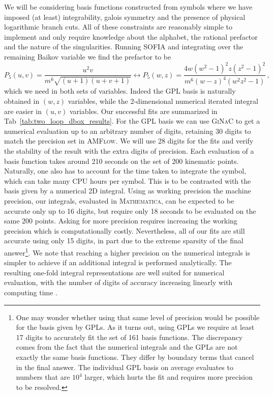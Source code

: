 \documentclass[a4paper,11pt]{article}
\begin{document}
We will be considering basis functions constructed from symbols where we have imposed (at least) integrability, galois symmetry and the presence of physical logarithmic branch cuts. All of these constraints are reasonably simple to implement and only require knowledge about the alphabet, the rational prefactor and the nature of the singularities. Running \textsc{SOFIA} and integrating over the remaining Baikov variable we find the prefactor to be 
\begin{equation}
    P_5(u,v)= \frac{u^2 v}{m^6 \sqrt{(u+1) (u+v+1)}} \leftrightarrow P_5(w,z)= \frac{4 w \left(w^2-1\right)^2 z \left(z^2-1\right)^2}{m^6 (w-z)^4 \left(w^2 z^2-1\right)} \,,
\end{equation}
which we need in both sets of variables. Indeed the GPL basis is naturally obtained in $(w,z)$ variables, while the 2-dimensional numerical iterated integral are easier in $(u,v)$ variables. Our successful fits are summarized in Tab~\ref{tab:two_loop_dbox_results}. For the GPL basis we can use \textsc{GiNaC} to get a numerical evaluation up to an arbitrary number of digits, retaining 30 digits to match the precision set in \textsc{AMFlow}. We will use 28 digits for the fits and verify the stability of the result with the extra digits of precision. Each evaluation of a basis function takes around 210 seconds on the set of 200 kinematic points. Naturally, one also has to account for the time taken to integrate the symbol, which can take many CPU hours per symbol. This is to be contrasted with the basis given by a numerical 2D integral. Using as working precision the machine precision, our integrals, evaluated in \textsc{Mathematica}, can be expected to be accurate only up to 16 digits, but require only 18 seconds to be evaluated on the same 200 points. Asking for more precision requires increasing the working precision which is computationally costly. Nevertheless, all of our fits are still accurate using only 15 digits, in part due to the extreme sparsity of the final answer\footnote{One may wonder whether using that same level of precision would be possible for the basis given by GPLs. As it turns out, using GPLs we require at least 17 digits to accurately fit the set of 161 basis functions. The discrepancy comes from the fact that the numerical integrals and the GPLs are not exactly the same basis functions. They differ by boundary terms that cancel in the final answer. The individual GPL basis on average evaluates to numbers that are $10^4$ larger, which hurts the fit and requires more precision to be resolved.}. We note that reaching a higher precision on the numerical integrals is simpler to achieve if an additional integral is performed analytically. The resulting one-fold integral representations are well suited for numerical evaluation, with the number of digits of accuracy increasing linearly with computing time \cite{Henn:2013pwa, Henn:2014qga}.
\end{document}
